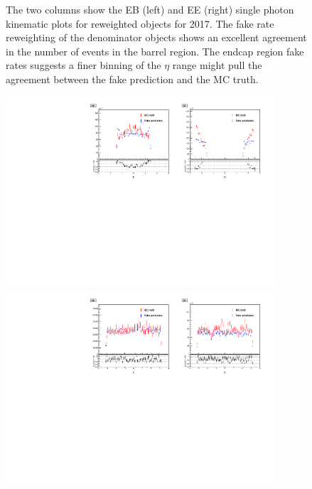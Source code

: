 \begin{figure}[!htbp]
\caption{The two columns show the EB (left) and EE (right) single photon kinematic plots for reweighted objects for 2017. The fake rate reweighting of the denominator objects shows an excellent agreement in the number of events in the barrel region. The endcap region fake rates suggests a finer binning of the $\eta$ range might pull the agreement between the fake prediction and the MC truth.}
\label{fig:kinematics17}
\end{figure}


\begin{figure}[!htbp]
\centering
\includegraphics[width=0.9\textwidth]{fig/closure_test_photon_kinematics_eta_2018sans_Denom.pdf}\\
\includegraphics[width=0.9\textwidth]{fig/closure_test_photon_kinematics_phi_2018sans_Denom.pdf} \\

\end{figure}
